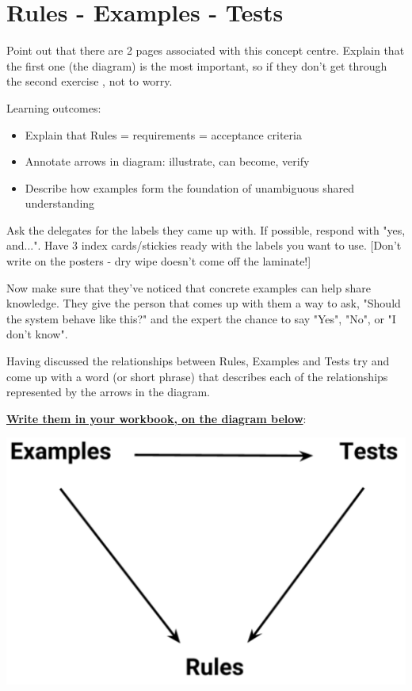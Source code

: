 \chapter*{Rules - Examples - Tests}

\ifnotes
    Point out that there are 2 pages associated with this concept centre. Explain that the first one (the diagram) is the most important, so if they don't get through the second exercise , not to worry.
    
    Learning outcomes:
    
    \begin{itemize}
        \item Explain that Rules = requirements = acceptance criteria
        \item Annotate arrows in diagram: illustrate, can become, verify
        \item Describe how examples form the foundation of unambiguous shared understanding
    \end{itemize}
    
    Ask the delegates for the labels they came up with. If possible, respond with "yes, and...". Have 3 index cards/stickies ready with the labels you want to use. [Don't write on the posters - dry wipe doesn't come off the laminate!]
    
    Now make sure that they've noticed that concrete examples can help share knowledge. They give the person that comes up with them a way to ask, "Should the system behave like this?" and the expert the chance to say "Yes", "No", or "I don't know".
\fi

\ifcontent

    
    Having discussed the relationships between Rules, Examples and Tests try and come up with a word (or short phrase) that describes each of the relationships represented by the arrows in the diagram. 
    
    \underline{\textbf{Write them in your workbook, on the diagram below}}:
    
    \vspace{2cm}
    
    \includegraphics[width=\textwidth]{images/examples-tests-rules}
\fi


